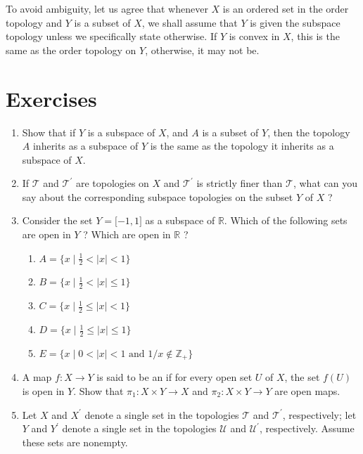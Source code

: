 To avoid ambiguity, let us agree that whenever \(X\) is an ordered set in the order topology and \(Y\) is a subset of \(X\), we shall assume that \(Y\) is given the subspace topology unless we specifically state otherwise. If \(Y\) is convex in \(X\), this is the same as the order topology on \(Y\), otherwise, it may not be.

\section*{Exercises}
\begin{enumerate}[itemsep=0.4em, parsep=0pt, topsep=0pt, partopsep=0pt, leftmargin=*, label=\arabic*., ref=\arabic*]
\item Show that if \(Y\) is a subspace of \(X\), and \(A\) is a subset of \(Y\), then the topology \(A\) inherits as a subspace of \(Y\) is the same as the topology it inherits as a subspace of \(X\).
\item If \(\mathcal{T}\) and \(\mathcal{T}^{\prime }\) are topologies on \(X\) and \(\mathcal{T}^{\prime }\) is strictly finer than \(\mathcal{T}\), what can you say about the corresponding subspace topologies on the subset \(Y\) of \(X\) ?
\item Consider the set \(Y = \lbrack -1, 1 \rbrack\) as a subspace of \(\mathbb{R}\). Which of the following sets are open in \(Y\) ? Which are open in \(\mathbb{R}\) ?
  \begin{enumerate}[itemsep=0.2em, parsep=0pt, topsep=0pt, partopsep=0pt, leftmargin=3em, label={}]
  \item \(A = \{ x \mid \frac{1}{2} < | x | < 1 \}\)
  \item \(B = \{ x \mid \frac{1}{2} < | x | \leq 1 \}\)
  \item \(C = \{ x \mid \frac{1}{2} \leq | x | < 1 \}\)
  \item \(D = \{ x \mid \frac{1}{2} \leq | x | \leq 1 \}\)
  \item \(E = \{ x \mid 0 < | x | < 1 \text{ and } 1/x \notin {\mathbb{Z}}_{+} \}\)
  \end{enumerate}
\item A map \(f : X \rightarrow Y\) is said to be an  if for every open set \(U\) of \(X\), the set \(f( U)\) is open in \(Y\). Show that \({\pi }_{1} : X \times Y \rightarrow X\) and \({\pi }_{2} : X \times Y \rightarrow Y\) are open maps.
\item Let \(X\) and \(X^{\prime }\) denote a single set in the topologies \(\mathcal{T}\) and \(\mathcal{T}^{\prime }\), respectively; let \(Y\) and \(Y^{\prime }\) denote a single set in the topologies \(\mathcal{U}\) and \(\mathcal{U}^{\prime }\), respectively. Assume these sets are nonempty.

\end{enumerate}
